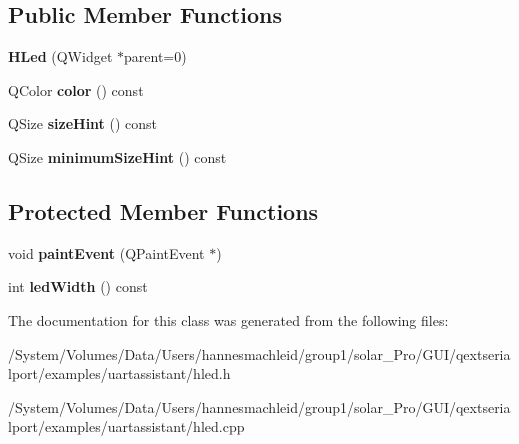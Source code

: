 \subsection*{Public Member Functions}
\begin{DoxyCompactItemize}
\item 
\mbox{\label{class_h_led_a84ac0da33849e1f9d80fcc084952f1d2}} 
{\bfseries H\+Led} (Q\+Widget $\ast$parent=0)
\item 
\mbox{\label{class_h_led_a28f07276dc25eadcb8f11fbc17ca739b}} 
Q\+Color {\bfseries color} () const
\item 
\mbox{\label{class_h_led_ab811bd256b700b7e894cc3b62515bcec}} 
Q\+Size {\bfseries size\+Hint} () const
\item 
\mbox{\label{class_h_led_a81dcd1eff3cbe1e345533880e02cf0da}} 
Q\+Size {\bfseries minimum\+Size\+Hint} () const
\end{DoxyCompactItemize}
\subsection*{Protected Member Functions}
\begin{DoxyCompactItemize}
\item 
\mbox{\label{class_h_led_ad06d035e601c42cc2a3b9d1229c73d36}} 
void {\bfseries paint\+Event} (Q\+Paint\+Event $\ast$)
\item 
\mbox{\label{class_h_led_a36a2ca8ce99a28ab52482e4a4b8b9db0}} 
int {\bfseries led\+Width} () const
\end{DoxyCompactItemize}


The documentation for this class was generated from the following files\+:\begin{DoxyCompactItemize}
\item 
/\+System/\+Volumes/\+Data/\+Users/hannesmachleid/group1/solar\+\_\+\+Pro/\+G\+U\+I/qextserialport/examples/uartassistant/hled.\+h\item 
/\+System/\+Volumes/\+Data/\+Users/hannesmachleid/group1/solar\+\_\+\+Pro/\+G\+U\+I/qextserialport/examples/uartassistant/hled.\+cpp\end{DoxyCompactItemize}
